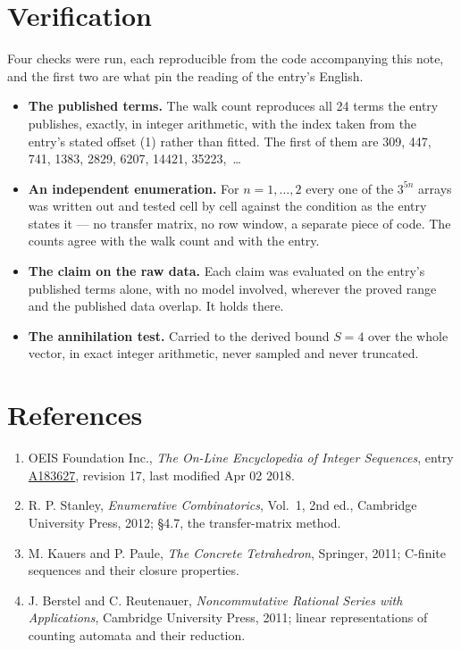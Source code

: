 \documentclass[11pt]{article}
\theoremstyle{definition}
\begin{document}
\section{Verification}

Four checks were run, each reproducible from the code accompanying this note, and the first two are what pin the reading of the entry's English.

\begin{itemize}

\item {\bfseries The published terms.} The walk count reproduces all 24 terms the entry publishes, exactly, in integer arithmetic, with the index taken from the entry's stated offset (1) rather than fitted. The first of them are 309, 447, 741, 1383, 2829, 6207, 14421, 35223,~\dots

\item {\bfseries An independent enumeration.} For $n = 1,\dots,2$ every one of the $3^{5n}$ arrays was written out and tested cell by cell against the condition as the entry states it --- no transfer matrix, no row window, a separate piece of code. The counts agree with the walk count and with the entry.

\item {\bfseries The claim on the raw data.} Each claim was evaluated on the entry's published terms alone, with no model involved, wherever the proved range and the published data overlap. It holds there.

\item {\bfseries The annihilation test.} Carried to the derived bound $S = 4$ over the whole vector, in exact integer arithmetic, never sampled and never truncated.

\end{itemize}

\section{References}

\begin{enumerate}

\item OEIS Foundation Inc., \emph{The On-Line Encyclopedia of Integer Sequences}, entry \href{https://oeis.org/A183627}{A183627}, revision 17, last modified Apr 02 2018.

\item R. P. Stanley, \emph{Enumerative Combinatorics}, Vol.~1, 2nd ed., Cambridge University Press, 2012; \S4.7, the transfer-matrix method.

\item M. Kauers and P. Paule, \emph{The Concrete Tetrahedron}, Springer, 2011; C-finite sequences and their closure properties.

\item J. Berstel and C. Reutenauer, \emph{Noncommutative Rational Series with Applications}, Cambridge University Press, 2011; linear representations of counting automata and their reduction.

\end{enumerate}
\end{document}
